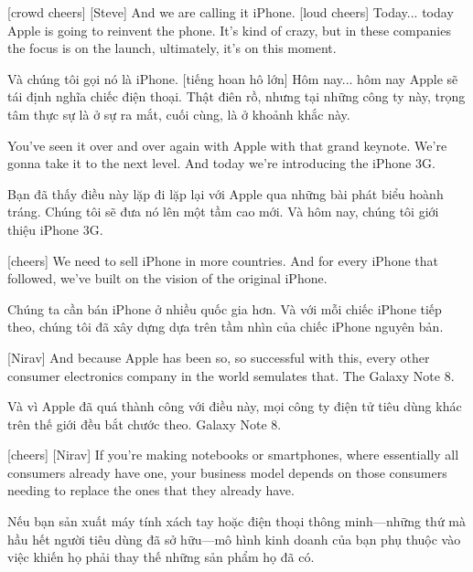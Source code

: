 \documentclass[a4paper]{article}
\begin{document}
	
	[crowd cheers]
	[Steve] And we are calling it iPhone.
	[loud cheers]
	Today...
	today Apple is going to reinvent the phone.
	It's kind of crazy, but in these companies the focus is on the launch, ultimately, it's on this moment.
	
	\begin{vietnamese-v2}
		 Và chúng tôi gọi nó là iPhone.  
		[tiếng hoan hô lớn]  
		Hôm nay...  
		hôm nay Apple sẽ tái định nghĩa chiếc điện thoại.  
		Thật điên rồ, nhưng tại những công ty này, trọng tâm thực sự là ở sự ra mắt, cuối cùng, là ở khoảnh khắc này.
	\end{vietnamese-v2}
	
	You've seen it over and over again with Apple with that grand keynote.
	We're gonna take it to the next level.
	And today we're introducing the iPhone 3G.
	
	\begin{vietnamese-v2}
		Bạn đã thấy điều này lặp đi lặp lại với Apple qua những bài phát biểu hoành tráng.  
		Chúng tôi sẽ đưa nó lên một tầm cao mới.  
		Và hôm nay, chúng tôi giới thiệu iPhone 3G.
	\end{vietnamese-v2}

	[cheers]
	We need to sell iPhone in more countries. And for every iPhone that followed, we've built on the vision of the original iPhone.
	
	\begin{vietnamese-v2}
		Chúng ta cần bán iPhone ở nhiều quốc gia hơn. Và với mỗi chiếc iPhone tiếp theo, chúng tôi đã xây dựng dựa trên tầm nhìn của chiếc iPhone nguyên bản.
	\end{vietnamese-v2}
	
	[Nirav] And because Apple has been so, so successful with this, every other consumer electronics company in the world semulates that.
	The Galaxy Note 8.
	
	\begin{vietnamese-v2}
		[Nirav] Và vì Apple đã quá thành công với điều này, mọi công ty điện tử tiêu dùng khác trên thế giới đều bắt chước theo.  
		Galaxy Note 8.
	\end{vietnamese-v2}
	
	
	[cheers]
	[Nirav] If you're making notebooks or smartphones, where essentially all consumers already have one, your business model depends on those consumers needing to replace the ones that they already have.
	
	\begin{vietnamese-v2}
		 Nếu bạn sản xuất máy tính xách tay hoặc điện thoại thông minh—những thứ mà hầu hết người tiêu dùng đã sở hữu—mô hình kinh doanh của bạn phụ thuộc vào việc khiến họ phải thay thế những sản phẩm họ đã có.
	\end{vietnamese-v2}
	
\end{document}
